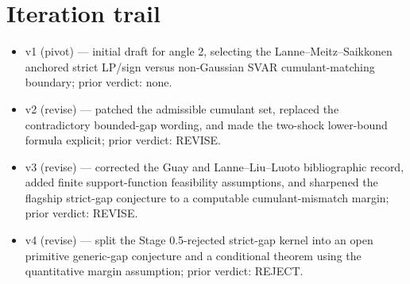 \documentclass[11pt]{article}
\theoremstyle{definition}
\theoremstyle{plain}
\theoremstyle{remark}
\begin{document}
\section{Iteration trail}
\begin{itemize}[leftmargin=*]
\item v1 (pivot) --- initial draft for angle 2, selecting the Lanne--Meitz--Saikkonen anchored strict LP/sign versus non-Gaussian SVAR cumulant-matching boundary; prior verdict: none.
\item v2 (revise) --- patched the admissible cumulant set, replaced the contradictory bounded-gap wording, and made the two-shock lower-bound formula explicit; prior verdict: REVISE.
\item v3 (revise) --- corrected the Guay and Lanne--Liu--Luoto bibliographic record, added finite support-function feasibility assumptions, and sharpened the flagship strict-gap conjecture to a computable cumulant-mismatch margin; prior verdict: REVISE.
\item v4 (revise) --- split the Stage 0.5-rejected strict-gap kernel into an open primitive generic-gap conjecture and a conditional theorem using the quantitative margin assumption; prior verdict: REJECT.
\end{itemize}
\end{document}
